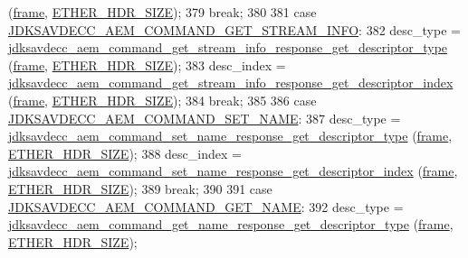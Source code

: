 \begin{DoxyCode}
      (\hyperlink{gst__avb__playbin_8c_ac8e710e0b5e994c0545d75d69868c6f0}{frame}, \hyperlink{namespaceavdecc__lib_a6c827b1a0d973e18119c5e3da518e65ca9512ad9b34302ba7048d88197e0a2dc0}{ETHER\_HDR\_SIZE});
379         \textcolor{keywordflow}{break};
380 
381     \textcolor{keywordflow}{case} \hyperlink{group__command_ga24ecb3f0fabecfdd85f217f77279d2ea}{JDKSAVDECC\_AEM\_COMMAND\_GET\_STREAM\_INFO}:
382         desc\_type = 
      \hyperlink{group__command__get__stream__info__response_ga8a6c2cdf1f47400b5e7802d1a3377f56}{jdksavdecc\_aem\_command\_get\_stream\_info\_response\_get\_descriptor\_type}
      (\hyperlink{gst__avb__playbin_8c_ac8e710e0b5e994c0545d75d69868c6f0}{frame}, \hyperlink{namespaceavdecc__lib_a6c827b1a0d973e18119c5e3da518e65ca9512ad9b34302ba7048d88197e0a2dc0}{ETHER\_HDR\_SIZE});
383         desc\_index = 
      \hyperlink{group__command__get__stream__info__response_ga58de15f7ac5f1bca0d0a586e6c0a35ba}{jdksavdecc\_aem\_command\_get\_stream\_info\_response\_get\_descriptor\_index}
      (\hyperlink{gst__avb__playbin_8c_ac8e710e0b5e994c0545d75d69868c6f0}{frame}, \hyperlink{namespaceavdecc__lib_a6c827b1a0d973e18119c5e3da518e65ca9512ad9b34302ba7048d88197e0a2dc0}{ETHER\_HDR\_SIZE});
384         \textcolor{keywordflow}{break};
385 
386     \textcolor{keywordflow}{case} \hyperlink{group__command_ga67c447f46660cc499e4175923e99d32c}{JDKSAVDECC\_AEM\_COMMAND\_SET\_NAME}:
387         desc\_type = \hyperlink{group__command__set__name__response_ga3a95f51790a717c477cf1729aa02306e}{jdksavdecc\_aem\_command\_set\_name\_response\_get\_descriptor\_type}
      (\hyperlink{gst__avb__playbin_8c_ac8e710e0b5e994c0545d75d69868c6f0}{frame}, \hyperlink{namespaceavdecc__lib_a6c827b1a0d973e18119c5e3da518e65ca9512ad9b34302ba7048d88197e0a2dc0}{ETHER\_HDR\_SIZE});
388         desc\_index = 
      \hyperlink{group__command__set__name__response_gac265a30c605f8469b6add2d6f1dd254d}{jdksavdecc\_aem\_command\_set\_name\_response\_get\_descriptor\_index}
      (\hyperlink{gst__avb__playbin_8c_ac8e710e0b5e994c0545d75d69868c6f0}{frame}, \hyperlink{namespaceavdecc__lib_a6c827b1a0d973e18119c5e3da518e65ca9512ad9b34302ba7048d88197e0a2dc0}{ETHER\_HDR\_SIZE});
389         \textcolor{keywordflow}{break};
390 
391     \textcolor{keywordflow}{case} \hyperlink{group__command_gab5a8244c35a72f9d4dcded988c51d8e3}{JDKSAVDECC\_AEM\_COMMAND\_GET\_NAME}:
392         desc\_type = \hyperlink{group__command__get__name__response_gadfcaac47791f78eeba3f25040e453265}{jdksavdecc\_aem\_command\_get\_name\_response\_get\_descriptor\_type}
      (\hyperlink{gst__avb__playbin_8c_ac8e710e0b5e994c0545d75d69868c6f0}{frame}, \hyperlink{namespaceavdecc__lib_a6c827b1a0d973e18119c5e3da518e65ca9512ad9b34302ba7048d88197e0a2dc0}{ETHER\_HDR\_SIZE});

\end{DoxyCode}
